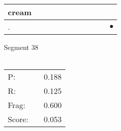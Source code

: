 \documentclass[landscape]{article}
\newcommand{\ssp}{\hspace{2pt}}
\newcommand{\mex}{\cellcolor{g}$\bullet$}
\begin{document}
\begin{tabular}{|l|p{10pt}|p{10pt}|p{10pt}|p{10pt}|p{10pt}|p{10pt}|p{10pt}|p{10pt}|p{10pt}|p{10pt}|}
\hline
\ssp cream \ssp&\hspace{2pt}&\hspace{2pt}&\hspace{2pt}&\hspace{2pt}&\hspace{2pt}&\hspace{2pt}&\hspace{2pt}&\hspace{2pt}&\hspace{2pt}&\hspace{2pt}\\
\hline
\ssp \cellcolor{ref9}. \ssp&\hspace{2pt}&\hspace{2pt}&\hspace{2pt}&\hspace{2pt}&\hspace{2pt}&\hspace{2pt}&\hspace{2pt}&\hspace{2pt}&\hspace{2pt}&\hspace{2pt}\mex\\
\hline
\end{tabular}

\vspace{6pt}
\noindent Segment 38\\\\
\noindent\begin{tabular}{lm{12pt}r}
\hline
P:&&0.188\\
R:&&0.125\\
Frag:&&0.600\\
Score:&&0.053\\
\end{tabular}

\newpage
\end{document}
